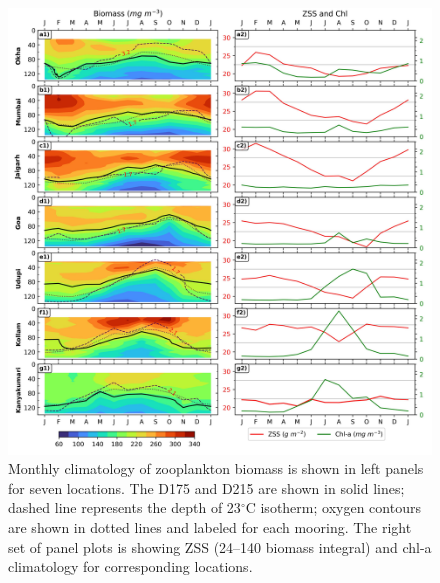 \documentclass[authoryear,review,12pt]{elsarticle}
\begin{document}
\begin{figure}[htbp]
	\centering
	\includegraphics[width=\textwidth]{./figures/climatology_biomass_ss_chl.jpeg} 
	\captionsetup{justification=justified,font=footnotesize,skip=0.05\baselineskip,width=\textwidth}
	\caption{Monthly climatology of zooplankton biomass is shown in left panels for seven locations. The D175 and D215 are shown in solid lines; dashed line represents the depth of 23$^{\circ}$C isotherm; oxygen contours are shown in dotted lines and labeled for each mooring. The right set of panel plots is showing ZSS (24--140 biomass integral) and chl-a climatology for corresponding locations.}
	\label{fig:zsschlclim}
\end{figure}
\end{document}
